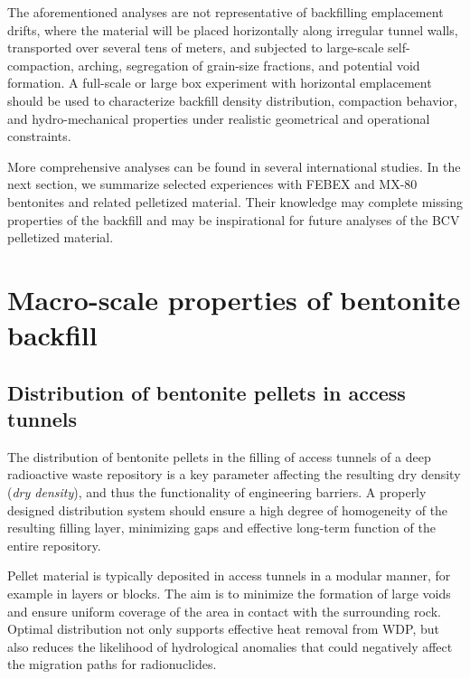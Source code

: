 The aforementioned analyses are not representative of backfilling emplacement drifts, where the material will be placed horizontally along irregular tunnel walls, transported over several tens of meters, and subjected to large-scale self-compaction, arching, segregation of grain-size fractions, and potential void formation. A full-scale or large box experiment with horizontal emplacement should be used to characterize backfill density distribution, compaction behavior, and hydro-mechanical properties under realistic geometrical and operational constraints.

More comprehensive analyses can be found in several international studies. In the next section, we summarize selected experiences with FEBEX and MX-80 bentonites and related pelletized material. Their knowledge may complete missing properties of the backfill and may be inspirational for future analyses of the \acrshort{BCV} pelletized material.



\section{Macro-scale properties of bentonite backfill}
\label{sec_advanced}

\subsection{Distribution of bentonite pellets in access tunnels}



The distribution of bentonite pellets in the filling of access tunnels of a deep radioactive waste repository is a key parameter affecting the resulting dry density (\textit{dry density}), and thus the functionality of engineering barriers. A properly designed distribution system should ensure a high degree of homogeneity of the resulting filling layer, minimizing gaps and effective long-term function of the entire repository.

Pellet material is typically deposited in access tunnels in a modular manner, for example in layers or blocks. The aim is to minimize the formation of large voids and ensure uniform coverage of the area in contact with the surrounding rock. Optimal distribution not only supports effective heat removal from \gls{WDP}, but also reduces the likelihood of hydrological anomalies that could negatively affect the migration paths for radionuclides.


